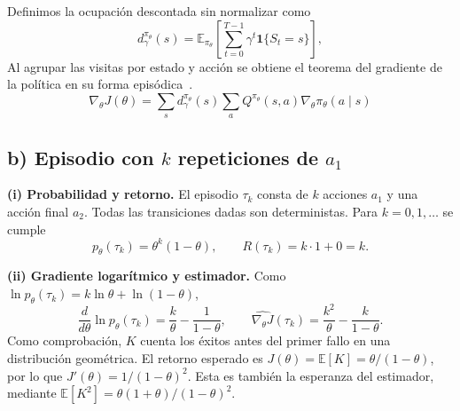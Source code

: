 Definimos la ocupación descontada sin normalizar como
\[
    d_\gamma^{\pi_\theta}(s)
       =\mathbb{E}_{\pi_\theta}\left[\sum_{t=0}^{T-1}
             \gamma^t\mathbf{1}\{S_t=s\}\right],
\]
Al agrupar las visitas por estado y acción se obtiene el teorema del gradiente de la política en su forma episódica~\cite[seccs.~13.1--13.2]{sutton}.
\begin{equation}
    \boxed{\nabla_\theta J(\theta)
      =\sum_s d_\gamma^{\pi_\theta}(s)
             \sum_a Q^{\pi_\theta}(s,a)\nabla_\theta\pi_\theta(a\mid s)}
\end{equation}

\subsection*{b) Episodio con $k$ repeticiones de $a_1$}

\textbf{(i) Probabilidad y retorno.}
El episodio $\tau_k$ consta de $k$ acciones $a_1$ y una acción final $a_2$. Todas las transiciones dadas son deterministas. Para $k=0,1,\ldots$ se cumple
\[
    p_\theta(\tau_k)=\theta^k(1-\theta),
    \qquad R(\tau_k)=k\cdot 1+0=k.
\]

\textbf{(ii) Gradiente logarítmico y estimador.}
Como $\ln p_\theta(\tau_k)=k\ln\theta+\ln(1-\theta)$,
\[
    \frac{d}{d\theta}\ln p_\theta(\tau_k)
       =\frac{k}{\theta}-\frac{1}{1-\theta},
    \qquad
    \boxed{\widehat{\nabla_\theta J}(\tau_k)
       =\frac{k^2}{\theta}-\frac{k}{1-\theta}}.
\]
Como comprobación, $K$ cuenta los éxitos antes del primer fallo en una distribución geométrica. El retorno esperado es $J(\theta)=\mathbb{E}[K]=\theta/(1-\theta)$, por lo que $J'(\theta)=1/(1-\theta)^2$. Esta es también la esperanza del estimador, mediante $\mathbb{E}[K^2]=\theta(1+\theta)/(1-\theta)^2$.
